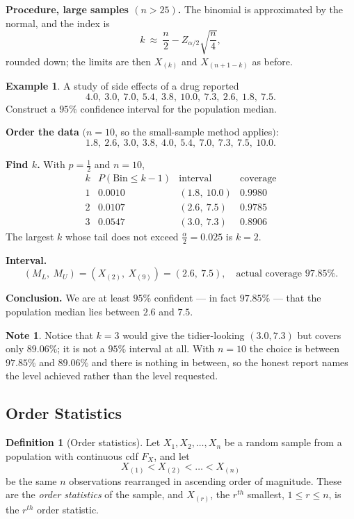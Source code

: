 \documentclass[11pt,a4paper]{article}
\theoremstyle{definition}
\newtheorem{definition}[thm]{Definition}
\newtheorem{example}[thm]{Example}
\newtheorem{note}[thm]{Note}
\begin{document}
\textbf{Procedure, large samples $(n > 25)$.} The binomial is approximated by the
normal, and the index is
$$k \ \approx\ \dfrac{n}{2} - Z_{\alpha/2}\sqrt{\dfrac{n}{4}},$$
rounded down; the limits are then $X_{(k)}$ and $X_{(n+1-k)}$ as before.

\begin{example}
A study of side effects of a drug reported
$$4.0,\ 3.0,\ 7.0,\ 5.4,\ 3.8,\ 10.0,\ 7.3,\ 2.6,\ 1.8,\ 7.5 .$$
Construct a $95\%$ confidence interval for the population median.

\textbf{Order the data} $(n = 10$, so the small-sample method applies$)$:
$$1.8,\ \mathbf{2.6},\ 3.0,\ 3.8,\ 4.0,\ 5.4,\ 7.0,\ 7.3,\ \mathbf{7.5},\ 10.0 .$$

\textbf{Find $k$.} With $p = \tfrac12$ and $n = 10$,
$$\begin{array}{c|c|c|c}
k & P\!\left(\text{Bin} \leq k-1\right) & \text{interval} & \text{coverage}\\\hline
1 & 0.0010 & (1.8,\ 10.0) & 0.9980\\
2 & 0.0107 & (2.6,\ 7.5) & 0.9785\\
3 & 0.0547 & (3.0,\ 7.3) & 0.8906
\end{array}$$
The largest $k$ whose tail does not exceed $\tfrac{\alpha}{2} = 0.025$ is
$k = 2$.

\textbf{Interval.}
$$\boxed{\left(M_L,\ M_U\right) = \left(X_{(2)},\ X_{(9)}\right)
= (2.6,\ 7.5),\quad\text{actual coverage } 97.85\% .}$$

\textbf{Conclusion.} We are at least $95\%$ confident --- in fact $97.85\%$ --- that
the population median lies between $2.6$ and $7.5$.
\end{example}

\begin{note}
Notice that $k = 3$ would give the tidier-looking $(3.0, 7.3)$ but covers only
$89.06\%$; it is not a $95\%$ interval at all. With $n = 10$ the choice is between
$97.85\%$ and $89.06\%$ and there is nothing in between, so the honest report names
the level achieved rather than the level requested.
\end{note}

\subsection{Order Statistics}
\begin{definition}[Order statistics]
Let $X_1,X_2,\dots,X_n$ be a random sample from a population with continuous cdf
$F_X$, and let
$$X_{(1)}<X_{(2)}<\dots<X_{(n)}$$
be the same $n$ observations rearranged in ascending order of magnitude. These are
the \emph{order statistics} of the sample, and $X_{(r)}$, the $r^{th}$ smallest,
$1\leq r\leq n$, is the $r^{th}$ order statistic.
\end{definition}
\end{document}
